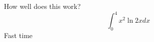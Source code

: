 \documentclass{article}
\begin{document}
How well does this work?
$$\int_0^4 x^2 \ln{2x}dx$$
Fast time
\end{document}
